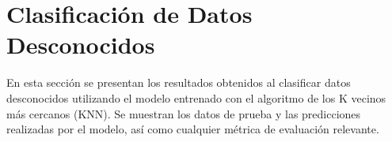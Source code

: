 
\section{Clasificación de Datos Desconocidos} \label{sec:Clasificación de Datos Desconocidos}


En esta sección se presentan los resultados obtenidos al clasificar datos desconocidos utilizando el modelo entrenado con el algoritmo de los K vecinos más cercanos (KNN). Se muestran los datos de prueba y las predicciones realizadas por el modelo, así como cualquier métrica de evaluación relevante.


\newpage


\newpage

